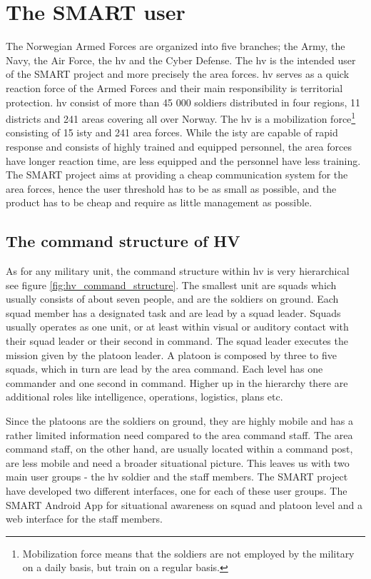 \section{The SMART user } \label{sec:smart_user}
The Norwegian Armed Forces are organized into five branches; the Army, the Navy, the Air Force, the \gls{hv} and the Cyber Defense. The \gls{hv} is the intended user of the SMART project and more precisely the area forces. \gls{hv} serves as a quick reaction force of the Armed Forces and their main responsibility is territorial protection. \gls{hv} consist of more than 45 000 soldiers distributed in four regions, 11 districts and 241 areas covering all over Norway\cite{forsvaret_home_guard}. The \gls{hv} is a mobilization force\footnote{Mobilization force means that the soldiers are not employed by the military on a daily basis, but train on a regular basis.} consisting of 15 \gls{isty} and 241 area forces. While the \gls{isty} are capable of rapid response and consists of highly trained and equipped personnel, the area forces have longer reaction time, are less equipped and the personnel have less training. The SMART project aims at providing a cheap communication system for the area forces, hence the user threshold has to be as small as possible, and the product has to be cheap and require as little management as possible.

\subsection{The command structure of HV}
As for any military unit, the command structure within \gls{hv} is very hierarchical see figure \ref{fig:hv_command_structure}. The smallest unit are squads which usually consists of about seven people, and are the soldiers on ground. Each squad member has a designated task and are lead by a squad leader. Squads usually operates as one unit, or at least within visual or auditory contact with their squad leader or their second in command. The squad leader executes the mission given by the platoon leader. A platoon is composed by three to five squads, which in turn are lead by the area command. Each level has one commander and one second in command. Higher up in the hierarchy there are additional roles like intelligence, operations, logistics, plans etc. 

Since the platoons are the soldiers on ground, they are highly mobile and has a rather limited information need compared to the area command staff. The area command staff, on the other hand, are usually located within a command post, are less mobile and need a broader situational picture. This leaves us with two main user groups - the \gls{hv} soldier and the staff members. The SMART project have developed two different interfaces, one for each of these user groups. The SMART Android App for situational awareness on squad and platoon level and a web interface for the staff members.


